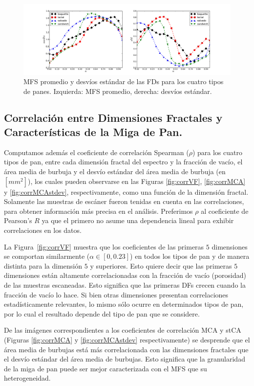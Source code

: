 \begin{figure}[h!]
\centering
\includegraphics[width=12cm]{panstd}
\caption[MFS promedio y desvíos estándar de las FDs para los cuatro tipos de panes]{MFS promedio y desvíos estándar de las FDs para los cuatro tipos de panes. Izquierda: MFS promedio, derecha: desvíos estándar.}
\label{fig:meansMFS}
\end{figure}

\subsection{Correlación entre Dimensiones Fractales y Características de la Miga de Pan.}

Computamos además el coeficiente de correlación Spearman ($\rho$) para los cuatro tipos de pan, entre cada dimensión fractal del espectro y la fracción de vacío, el área media de burbuja y el desvío estándar del área media de burbuja (en $[mm^{2}]$), los cuales pueden observarse en las Figuras \ref{fig:corrVF}, \ref{fig:corrMCA} y \ref{fig:corrMCAstdev}, respectivamente, como una función de la dimensión fractal.
Solamente las muestras de escáner fueron tenidas en cuenta en las correlaciones, para obtener información más precisa en el análisis.
Preferimos $\rho$ al coeficiente de Pearson's $R$ ya que el primero no asume una dependencia lineal para exhibir correlaciones en los datos.

La Figura~\ref{fig:corrVF} muestra que los coeficientes de las primeras $5$ dimensiones se comportan similarmente ($\alpha \in [0,0.23]$) en todos los tipos de pan y de manera distinta para la dimensión $5$ y superiores. Esto quiere decir que las primeras $5$ dimensiones están altamente correlacionadas con la fracción de vacío (porosidad) de las muestras escaneadas. Esto significa que las primeras DFs crecen cuando la fracción de vacío lo hace. Si bien otras dimensiones presentan correlaciones estadísticamente relevantes, lo mismo sólo ocurre en determinados tipos de pan, por lo cual el resultado depende del tipo de pan que se considere.

De las imágenes correspondientes a los coeficientes de correlación MCA y stCA (Figuras \ref{fig:corrMCA} y \ref{fig:corrMCAstdev} respectivamente) se desprende que el área media de burbujas está más correlacionada con las dimensiones fractales que el desvío estándar del área media de burbujas. Esto significa que la granularidad de la miga de pan puede ser mejor caracterizada con el MFS que su heterogeneidad.


